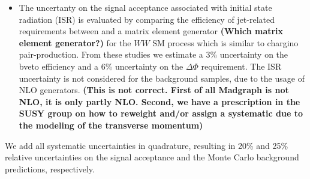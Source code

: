 \begin{itemize}
\item The uncertanty on the signal acceptance associated with initial state
  radiation (ISR) is evaluated by comparing the efficiency of jet-related
  requirements between \PYTHIA and a matrix element generator
  {\bf (Which matrix element generator?)} for the $WW$ SM process which
  is similar to chargino pair-production.  From these studies we estimate
  a 3\% uncertainty on the bveto efficiency and a 6\% uncertainty on the
  $\Delta \Phi$ requirement.
  The ISR uncertainty is not considered for the background samples, due to the
  usage of NLO generators.
  {\bf (This is not correct.  First of all Madgraph is not NLO, it is
    only partly NLO.  Second, we have a prescription in the SUSY group on how
    to reweight and/or assign a systematic due to the modeling of
    the \ttbar transverse momentum)}

\end{itemize}


\noindent We add all systematic uncertainties in quadrature, resulting  
in 20\% and 25\% relative uncertainties on the signal
acceptance and the Monte Carlo background predictions, respectively.

